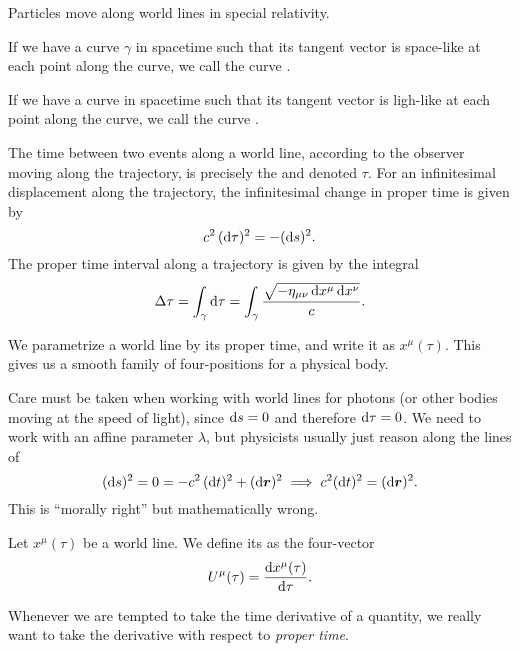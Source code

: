 Particles move along world lines in special relativity.

\M
If we have a curve $\gamma$ in spacetime such that its tangent vector is
space-like at each point along the curve, we call the curve
.

If we have a curve in spacetime such that its tangent vector is
ligh-like at each point along the curve, we call the curve
. 


\label{chunk:relativity:proper-time}
The time between two events along a world line, according to the
observer moving along the trajectory, is precisely the
 and denoted $\tau$. For an infinitesimal
displacement along the trajectory, the infinitesimal change in proper
time is given by
\begin{equation}
c^{2}\,(\mathrm{d}\tau)^{2} = -(\mathrm{d} s)^{2}.
\end{equation}
The proper time interval along a trajectory is given by the integral
\begin{equation}
\Delta\tau = \int_{\gamma}\mathrm{d}\tau =
\int_{\gamma}\frac{\sqrt{-\eta_{\mu\nu}\,\mathrm{d} x^{\mu}\,\mathrm{d} x^{\nu}}}{c}.
\end{equation}

We parametrize a world line by its proper time, and write it as
$x^{\mu}(\tau)$. This gives us a smooth family of four-positions for a
physical body.

Care must be taken when working with world lines for photons (or other
bodies moving at the speed of light), since $\mathrm{d} s = 0$ and therefore
$\mathrm{d}\tau=0$. We need to work with an affine parameter $\lambda$, but
physicists usually just reason along the lines of
\begin{equation}
(\mathrm{d} s)^{2} = 0 = -c^{2}\,(\mathrm{d} t)^{2} + (\mathrm{d}\boldsymbol{r})^{2}\implies c^{2}(\mathrm{d} t)^{2}=(\mathrm{d}\boldsymbol{r})^{2}.
\end{equation}
This is ``morally right'' but mathematically wrong.

\begin{definition}
Let $x^{\mu}(\tau)$ be a world line. We define its 
as the four-vector
\begin{equation*}
U^{\mu}(\tau) = \frac{\mathrm{d} x^{\mu}(\tau)}{\mathrm{d}\tau}.
\end{equation*}
\end{definition}

\begin{remark}
Whenever we are tempted to take the time derivative of a quantity, we
really want to take the derivative with respect to \emph{proper time}.
\end{remark}

